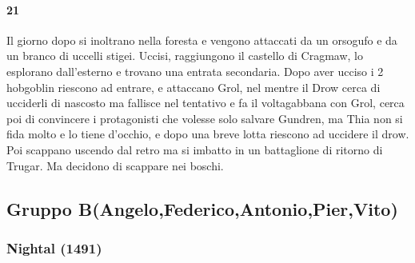 \documentclass{article}
\begin{document}
          \paragraph{21}  
            Il giorno dopo si inoltrano nella foresta e vengono attaccati da un orsogufo e da un branco di uccelli stigei. Uccisi, raggiungono il castello di Cragmaw, lo esplorano dall'esterno e trovano una entrata secondaria. Dopo aver ucciso i 2 hobgoblin riescono ad entrare, e attaccano Grol, nel mentre il Drow cerca di ucciderli di nascosto ma fallisce nel tentativo e fa il voltagabbana con Grol, cerca poi di convincere i protagonisti che volesse solo salvare Gundren, ma Thia non si fida molto e lo tiene d'occhio, e dopo una breve lotta riescono ad uccidere il drow. Poi scappano uscendo dal retro ma si imbatto in un battaglione di ritorno di Trugar. Ma decidono di scappare nei boschi. 
          \subsection{Gruppo B(Angelo,Federico,Antonio,Pier,Vito)}
              \subsubsection{Nightal (1491)}
\end{document}
